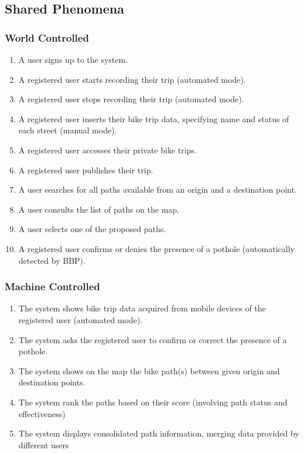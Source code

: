 \subsection{Shared Phenomena}

\subsubsection{World Controlled}

\begin{enumerate}
    \item A user signs up to the system.
    \item A registered user starts recording their trip (automated mode).
    \item A registered user stops recording their trip (automated mode).
    \item A registered user inserts their bike trip data, specifying name and status of each street (manual mode).
    \item A registered user accesses their private bike trips.
    \item A registered user publishes their trip.
    \item A user searches for all paths available from an origin and a destination point.
    \item A user consults the list of paths on the map.
    \item A user selects one of the proposed paths.
    \item A registered user confirms or denies the presence of a pothole (automatically detected by BBP).
\end{enumerate}

\subsubsection{Machine Controlled}

\begin{enumerate}
    \item The system shows bike trip data acquired from mobile devices of the registered user (automated mode).
    \item The system asks the registered user to confirm or correct the presence of a pothole.
    \item The system shows on the map the bike path(s) between given origin and destination points.
    \item The system rank the paths based on their score (involving path status and effectiveness)
    \item The system displays consolidated path information, merging data provided by different users
\end{enumerate}

